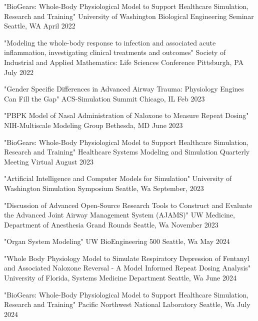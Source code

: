 \begin{cventries}
  \cventry
    {"BioGears: Whole-Body Physiological Model to Support Healthcare Simulation, Research and Training"} %
    {University of Washington Biological Engineering Seminar} %
    {Seattle, WA} %
    {April 2022} %
     {
     }

  \cventry
    {"Modeling the whole-body response to infection and associated acute inflammation, investigating clinical treatments and outcomes"} %
    {Society of Industrial and Applied Mathematics: Life Sciences Conference} %
    {Pittsburgh, PA} %
    {July 2022} %
     {
     }

  \cventry
    {"Gender Specific Differences in Advanced Airway Trauma: Physiology Engines Can Fill the Gap"} %
    {ACS-Simulation Summit} %
    {Chicago, IL} %
    {Feb 2023} %
     {
     }

  \cventry
    {"PBPK Model of Nasal Administration of Naloxone to Measure Repeat Dosing"} %
    {NIH-Multiscale Modeling Group} %
    {Bethesda, MD} %
    {June 2023} %
     {
     }

  \cventry
    {"BioGears: Whole-Body Physiological Model to Support Healthcare Simulation, Research and Training"} %
    {Healthcare Systems Modeling and Simulation Quarterly Meeting} %
    {Virtual} %
    {August 2023} %
     {
     }

  \cventry
    {"Artificial Intelligence and Computer Models for Simulation"} %
    {University of Washington Simulation Symposium} %
    {Seattle, Wa} %
    {September, 2023} %
     {
     }

  \cventry
    {"Discussion of Advanced Open-Source Research Tools to Construct  and Evaluate the Advanced Joint Airway Management System (AJAMS)"} %
    {UW Medicine, Department of Anesthesia Grand Rounds} %
    {Seattle, Wa} %
    {November 2023} %
     {
     }

  \cventry
    {"Organ System Modeling"} %
    {UW BioEngineering 500} %
    {Seattle, Wa} %
    {May 2024} %
     {
     }

  \cventry
    {"Whole Body Physiology Model to Simulate Respiratory Depression of Fentanyl and Associated Naloxone Reversal - A Model Informed Repeat Dosing Analysis"} %
    {University of Florida, Systems Medicine Department} %
    {Seattle, Wa} %
    {June 2024} %
     {
     }

  \cventry
    {"BioGears: Whole-Body Physiological Model to Support Healthcare Simulation, Research and Training"} %
    {Pacific Northwest National Laboratory} %
    {Seattle, Wa} %
    {July 2024} %
     {
     }

\end{cventries}
